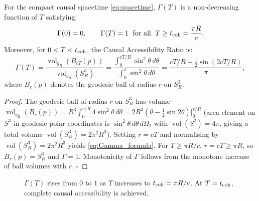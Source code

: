 \documentclass[12pt,a4paper]{article}
\theoremstyle{plain}
\theoremstyle{definition}
\theoremstyle{remark}
\newcommand{\vol}{\operatorname{vol}}
\begin{document}
\begin{tcolorbox}[thmbox={Theorem II — Causal Accessibility Completeness}]
\label{thm:II}
For the compact causal spacetime \eqref{eq:spacetime},
$\Gamma(T)$ is a non-decreasing function of $T$ satisfying:
\begin{equation}
  \Gamma(0) = 0, \qquad
  \Gamma(T) = 1 \;\text{ for all }\; T \ge t_{\rm coh} = \frac{\pi R}{c}.
  \label{eq:Gamma_complete}
\end{equation}
Moreover, for $0 < T < t_{\rm coh}$, the Causal Accessibility Ratio is:
\begin{equation}
  \Gamma(T)
  = \frac{\vol_{g_R}(B_{cT}(p))}{\vol_{g_R}(S^3_R)}
  = \frac{\int_0^{cT/R} \sin^2\!\theta\,d\theta}
         {\int_0^{\pi} \sin^2\!\theta\,d\theta}
  = \frac{cT/R - \tfrac{1}{2}\sin(2cT/R)}{\pi},
  \label{eq:Gamma_formula}
\end{equation}
where $B_r(p)$ denotes the geodesic ball of radius $r$ on $S^3_R$.
\end{tcolorbox}

\begin{proof}
The geodesic ball of radius $r$ on $S^3_R$ has volume
$\vol_{g_R}(B_r(p)) = R^3 \int_0^{r/R} 4\sin^2\!\theta\,d\theta
= 2R^3(\theta - \tfrac{1}{2}\sin 2\theta)\big|_0^{r/R}$
(area element on $S^3$ in geodesic polar coordinates is $\sin^2\!\theta\,d\theta\,d\Omega_2$
with $\vol(S^2)=4\pi$, giving a total volume $\vol(S^3_R) = 2\pi^2 R^3$).
Setting $r = cT$ and normalising by $\vol(S^3_R) = 2\pi^2 R^3$
yields \eqref{eq:Gamma_formula}.
For $T \ge \pi R/c$, $r = cT \ge \pi R$, so $B_r(p) = S^3_R$ and $\Gamma = 1$.
Monotonicity of $\Gamma$ follows from the monotone increase of ball volumes with $r$.
\hfill$\square$
\end{proof}

\begin{figure}[h!]
\centering
{}
\caption{$\Gamma(T)$ rises from $0$ to $1$ as $T$ increases to $t_{\rm coh}=\pi R/c$.
  At $T=t_{\rm coh}$, complete causal accessibility is achieved.}
\label{fig:gamma}
\end{figure}
\end{document}
